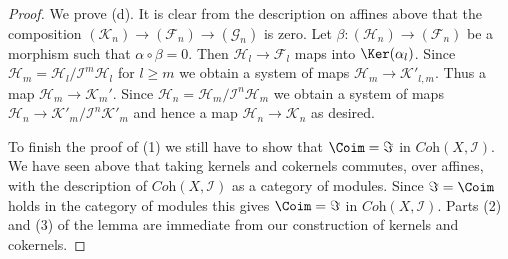 \begin{proof}
\medskip\noindent
We prove (d). It is clear from the description on affines above that
the composition $(\mathcal{K}_n) \to (\mathcal{F}_n) \to (\mathcal{G}_n)$
is zero. Let $\beta : (\mathcal{H}_n) \to (\mathcal{F}_n)$
be a morphism such that $\alpha \circ \beta = 0$. Then
$\mathcal{H}_l \to \mathcal{F}_l$ maps into $\Ker(\alpha_l)$.
Since $\mathcal{H}_m = \mathcal{H}_l/\mathcal{I}^m\mathcal{H}_l$
for $l \geq m$ we obtain a system of maps
$\mathcal{H}_m \to \mathcal{K}'_{l, m}$. Thus a map
$\mathcal{H}_m \to \mathcal{K}_m'$. Since
$\mathcal{H}_n = \mathcal{H}_m/\mathcal{I}^n\mathcal{H}_m$ we obtain
a system of maps $\mathcal{H}_n \to \mathcal{K}'_m/\mathcal{I}^n\mathcal{K}'_m$
and hence a map $\mathcal{H}_n \to \mathcal{K}_n$ as desired.

\medskip\noindent
To finish the proof of (1) we still have to show that $\Coim = \Im$
in $\textit{Coh}(X, \mathcal{I})$. We have seen above that taking
kernels and cokernels commutes, over affines, with the description
of $\textit{Coh}(X, \mathcal{I})$ as a category of modules. Since
$\Im = \Coim$ holds in the category of modules
this gives $\Coim = \Im$ in $\textit{Coh}(X, \mathcal{I})$.
Parts (2) and (3) of the lemma are immediate from our construction
of kernels and cokernels.
\end{proof}
